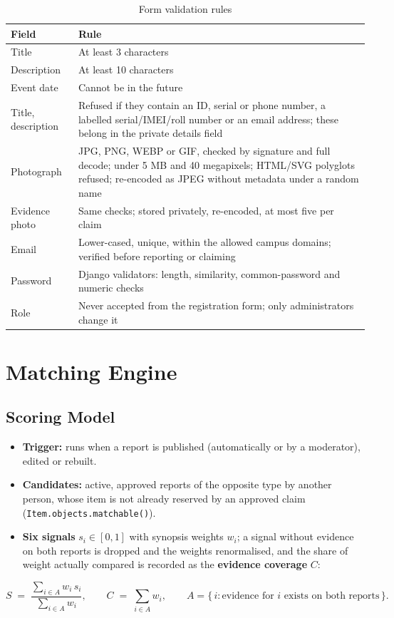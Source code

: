 \documentclass[12pt,a4paper,oneside]{report}
\newcommand{\code}[1]{\texttt{#1}}
\begin{document}
\begin{table}[H]
\centering\small
\caption{Form validation rules}
\begin{tabularx}{\textwidth}{P{30mm}X}
\toprule
Field & Rule\\
\midrule
Title & At least 3 characters\\
Description & At least 10 characters\\
Event date & Cannot be in the future\\
Title, description & Refused if they contain an ID, serial or phone number, a labelled serial/IMEI/roll number or an email address; these belong in the private details field\\
Photograph & JPG, PNG, WEBP or GIF, checked by signature and full decode; under 5 MB and 40 megapixels; HTML/SVG polyglots refused; re-encoded as JPEG without metadata under a random name\\
Evidence photo & Same checks; stored privately, re-encoded, at most five per claim\\
Email & Lower-cased, unique, within the allowed campus domains; verified before reporting or claiming\\
Password & Django validators: length, similarity, common-password and numeric checks\\
Role & Never accepted from the registration form; only administrators change it\\
\bottomrule
\end{tabularx}
\end{table}

\section{Matching Engine}
\subsection{Scoring Model}
\begin{itemize}
  \item \textbf{Trigger:} runs when a report is published (automatically or by a moderator), edited or rebuilt.
  \item \textbf{Candidates:} active, approved reports of the opposite type by another person, whose item is not already reserved by an approved claim (\code{Item.objects.matchable()}).
  \item \textbf{Six signals} $s_i \in [0,1]$ with synopsis weights $w_i$; a signal without evidence on both reports is dropped and the weights renormalised, and the share of weight actually compared is recorded as the \textbf{evidence coverage} $C$:
\end{itemize}
\begin{equation}
S \;=\; \frac{\sum_{i \in A} w_i\, s_i}{\sum_{i \in A} w_i}, \qquad C \;=\; \sum_{i \in A} w_i, \qquad A = \{\, i : \text{evidence for } i \text{ exists on both reports} \,\}.
\end{equation}
\end{document}
